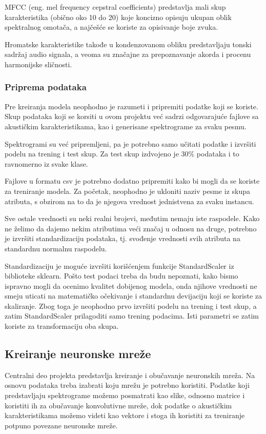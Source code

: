 \documentclass{article}
\begin{document}
MFCC (eng. mel frequency cepstral coefficients) predstavlja mali skup karakteristika (obično oko 10 do 20) koje koncizno opisuju ukupan oblik spektralnog omotača, a najčešće se koriste za opisivanje boje zvuka.

Hromatske karakteristike takođe u kondenzovanom obliku predstavljaju tonski sadržaj audio signala, a veoma su značajne za prepoznavanje akorda i procenu harmonijske sličnosti.

\subsubsection{Priprema podataka}

Pre kreiranja modela neophodno je razumeti i pripremiti podatke koji se koriste. Skup podataka koji se korsiti u ovom projektu već sadrzi odgovarajuće fajlove sa akustičkim karakteristikama, kao i generisane spektrograme za svaku pesmu.

Spektrogrami su već pripremljeni, pa je potrebno samo učitati podatke i izvršiti podelu na trening i test skup. Za test skup izdvojeno je 30\% podataka i to ravnomerno iz svake klase.

Fajlove u formatu csv je potrebno dodatno pripremiti kako bi mogli da se koriste za treniranje modela. Za početak, neophodno je ukloniti naziv pesme iz skupa atributa, s obzirom na to da je njegova vrednost jednistvena za svaku instancu.

Sve ostale vrednosti su neki realni brojevi, međutim nemaju iste raspodele. Kako ne želimo da dajemo nekim atributima veći značaj u odnosu na druge, potrebno je izvršiti standardizaciju podataka, tj. svođenje vrednosti svih atributa na standardnu normalnu raspodelu.

Standardizaciju je moguće izvršiti korišćenjem funkcije StandardScaler iz biblioteke sklearn. Pošto test podaci treba da budu nepoznati, kako bismo ispravno mogli da ocenimo kvalitet dobijenog modela, onda njihove vrednosti ne smeju uticati na matematičko očekivanje i standardnu devijaciju koji se koriste za skaliranje. Zbog toga je neophodno prvo izvršiti podelu na trening i test skup, a zatim StandardScaler prilagoditi samo trening podacima. Isti parametri se zatim koriste za transformaciju oba skupa.

\subsection{Kreiranje neuronske mreže}

Centralni deo projekta predstavlja kreiranje i obučavanje neuronskih mreža. Na osnovu podataka treba izabrati koju mrežu je potrebno koristiti. Podatke koji predstavljaju spektrograme možemo posmatrati kao slike, odnosno matrice i koristiti ih za obučavanje konvolutivne mreže, dok podatke o akustičkim karakteristikama možemo videti kao vektore i stoga ih koristiti za treniranje potpuno povezane neuronske mreže.
\end{document}
